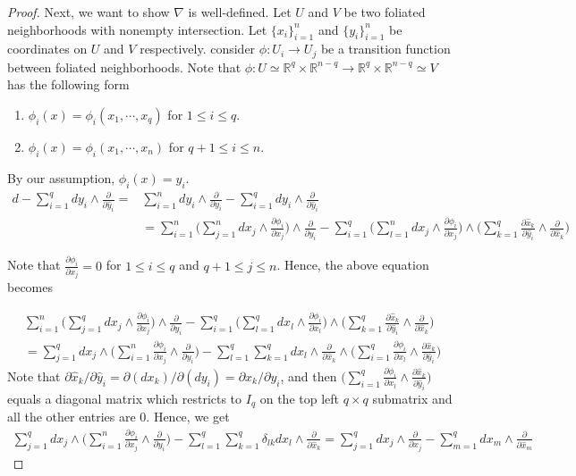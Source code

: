 \documentclass[12pt]{amsart}
\theoremstyle{definition}
\theoremstyle{remark}
\numberwithin{equation}{section}
\newcommand{\del}{\partial}
\renewcommand{\del}{\partial}
\newcommand{\R}{{\mathbb{R}}}
\newcommand{\1}{{\mathbb{1}}}
\begin{document}
\begin{proof}
	Next, we want to show $\nabla$ is well-defined. Let $U$ and $V$ be two foliated neighborhoods with nonempty intersection. Let $\{x_i\}_{i=1}^n$ and $\{y_i\}_{i=1}^n$ be coordinates on $U$ and $V$ respectively. consider $\phi: U_i \to U_j$ be a transition function between foliated neighborhoods. Note that $\phi: U\simeq \R^q\times \R^{n-q} \to  \R^q\times \R^{n-q}\simeq V$ has the following form
	\begin{enumerate}
		\item $\phi_i(x)=\phi_i(x_1,\cdots, x_q)$ for $1\le i\le q$.
	    \item $\phi_i(x)=\phi_i(x_1,\cdots, x_n)$ for $q+1 \le i\le n$.
	\end{enumerate} 
    By our assumption, $\phi_i(x) = y_i$.
    \begin{align*}
    d - \sum_{i=1}^q dy_i\wedge \frac{\del}{\del \hat{y}_i} =& \sum_{i=1}^n dy_i\wedge \frac{\del}{\del y_i}- \sum_{i=1}^q dy_i\wedge \frac{\del}{\del \hat{y}_i}\\
    &= \sum_{i=1}^n \Big(\sum_{j=1}^n dx_j \wedge\frac{\partial \phi_i}{ \del x_j}\Big)\wedge \frac{\del}{\del y_i}- \sum_{i=1}^q \Big(\sum_{l=1}^n dx_j \wedge\frac{\partial \phi_i}{ \del x_j}\Big)\wedge \Big(\sum_{k=1}^{q}\frac{\del \hat{x}_k}{\del \hat{y}_i}\wedge \frac{\del}{\del \hat{x}_k}\Big) 
    \end{align*}
    
    Note that $\frac{\del \phi_i}{\del x_j} = 0$ for $1\le i \le q$ and $q+1 \le j \le n$. Hence, the above equation becomes
    
    \begin{align*}
    \sum_{i=1}^n \Big(\sum_{j=1}^q dx_j \wedge\frac{\partial \phi_i}{ \del x_j}\Big)\wedge \frac{\del}{\del y_i}- \sum_{i=1}^q \Big(\sum_{l=1}^q dx_l \wedge\frac{\partial \phi_i}{ \del x_l}\Big)\wedge \Big(\sum_{k=1}^{q}\frac{\del \hat{x}_k}{\del \hat{y}_i}\wedge \frac{\del}{\del \hat{x}_k}\Big) \\
    =\sum_{j=1}^q dx_j \wedge \Big( \sum_{i=1}^n \frac{\partial \phi_i}{ \del x_j}\wedge \frac{\del}{\del y_i}\Big)-  \sum_{l=1}^q\sum_{k=1}^{q} dx_l \wedge \frac{\del}{\del \hat{x}_k} \wedge \Big(\sum_{i=1}^q \frac{\partial \phi_i}{ \del x_l}\wedge \frac{\del \hat{x}_k}{\del \hat{y}_i}\Big) 
    \end{align*}
    Note that ${\del \hat{x}_k}/{\del \hat{y}_i}= {\del (dx_k)}/{\del (dy_i)}= \del x_k/\del y_i$, and then $\Big(\sum_{i=1}^q \frac{\partial \phi_i}{ \del x_l}\wedge \frac{\del \hat{x}_k}{\del \hat{y}_i}\Big) $ equals a diagonal matrix which restricts to $I_q$ on the top left $q\times q$ submatrix and all the other entries are 0. Hence, we get
    \begin{align*}
    \sum_{j=1}^q dx_j \wedge \Big( \sum_{i=1}^n \frac{\partial \phi_i}{ \del x_j}\wedge \frac{\del}{\del y_i}\Big)-  \sum_{l=1}^q\sum_{k=1}^{q} \delta_{lk} dx_l \wedge \frac{\del}{\del \hat{x}_k} 
    =  \sum_{j=1}^q dx_j \wedge  \frac{\del}{\del x_j}-  \sum_{m=1}^q dx_m \wedge \frac{\del}{\del \hat{x}_m} 
    \end{align*}
    
   
	\end{proof}
\end{document}
